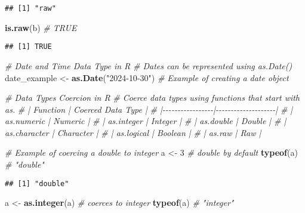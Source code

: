 \documentclass[
]{article}
\newenvironment{Shaded}{\begin{snugshade}}{\end{snugshade}}
\newcommand{\CommentTok}[1]{\textcolor[rgb]{0.56,0.35,0.01}{\textit{#1}}}
\newcommand{\DecValTok}[1]{\textcolor[rgb]{0.00,0.00,0.81}{#1}}
\newcommand{\FunctionTok}[1]{\textcolor[rgb]{0.13,0.29,0.53}{\textbf{#1}}}
\newcommand{\NormalTok}[1]{#1}
\newcommand{\OtherTok}[1]{\textcolor[rgb]{0.56,0.35,0.01}{#1}}
\newcommand{\StringTok}[1]{\textcolor[rgb]{0.31,0.60,0.02}{#1}}
\begin{document}
\begin{verbatim}
## [1] "raw"
\end{verbatim}

\begin{Shaded}
\begin{Highlighting}[]
\FunctionTok{is.raw}\NormalTok{(b)                }\CommentTok{\# TRUE}
\end{Highlighting}
\end{Shaded}

\begin{verbatim}
## [1] TRUE
\end{verbatim}

\begin{Shaded}
\begin{Highlighting}[]
\CommentTok{\# Date and Time Data Type in R}
\CommentTok{\# Dates can be represented using as.Date()}
\NormalTok{date\_example }\OtherTok{\textless{}{-}} \FunctionTok{as.Date}\NormalTok{(}\StringTok{"2024{-}10{-}30"}\NormalTok{)  }\CommentTok{\# Example of creating a date object}

\CommentTok{\# Data Types Coercion in R}
\CommentTok{\# Coerce data types using functions that start with as.}
\CommentTok{\# | Function        | Coerced Data Type |}
\CommentTok{\# |{-}{-}{-}{-}{-}{-}{-}{-}{-}{-}{-}{-}{-}{-}{-}{-}{-}|{-}{-}{-}{-}{-}{-}{-}{-}{-}{-}{-}{-}{-}{-}{-}{-}{-}{-}{-}{-}|}
\CommentTok{\# | as.numeric      | Numeric            |}
\CommentTok{\# | as.integer      | Integer            |}
\CommentTok{\# | as.double       | Double             |}
\CommentTok{\# | as.character    | Character          |}
\CommentTok{\# | as.logical      | Boolean            |}
\CommentTok{\# | as.raw          | Raw                |}

\CommentTok{\# Example of coercing a double to integer}
\NormalTok{a }\OtherTok{\textless{}{-}} \DecValTok{3}                  \CommentTok{\# double by default}
\FunctionTok{typeof}\NormalTok{(a)               }\CommentTok{\# "double"}
\end{Highlighting}
\end{Shaded}

\begin{verbatim}
## [1] "double"
\end{verbatim}

\begin{Shaded}
\begin{Highlighting}[]
\NormalTok{a }\OtherTok{\textless{}{-}} \FunctionTok{as.integer}\NormalTok{(a)      }\CommentTok{\# coerces to integer}
\FunctionTok{typeof}\NormalTok{(a)               }\CommentTok{\# "integer"}
\end{Highlighting}
\end{Shaded}
\end{document}
